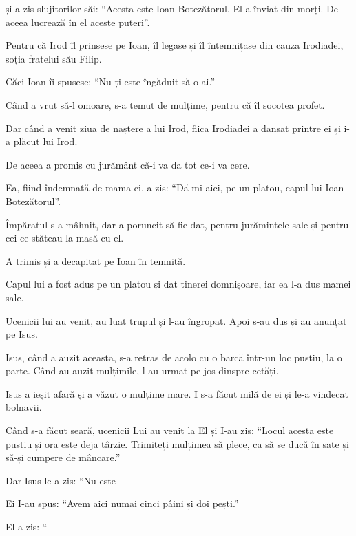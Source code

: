 {și a zis slujitorilor săi: “Acesta este Ioan Botezătorul. El a înviat din morți. De aceea lucrează în el aceste puteri”.

Pentru că Irod îl prinsese pe Ioan, îl legase și îl întemnițase din cauza Irodiadei, soția fratelui său Filip.

Căci Ioan îi spusese: “Nu-ți este îngăduit să o ai.”

Când a vrut să-l omoare, s-a temut de mulțime, pentru că îl socotea profet.

Dar când a venit ziua de naștere a lui Irod, fiica Irodiadei a dansat printre ei și i-a plăcut lui Irod.

De aceea a promis cu jurământ că-i va da tot ce-i va cere.

Ea, fiind îndemnată de mama ei, a zis: “Dă-mi aici, pe un platou, capul lui Ioan Botezătorul”.


\par }{\PP {}Împăratul s-a mâhnit, dar a poruncit să fie dat, pentru jurămintele sale și pentru cei ce stăteau la masă cu el.

A trimis și a decapitat pe Ioan în temniță.

Capul lui a fost adus pe un platou și dat tinerei domnișoare, iar ea l-a dus mamei sale.

Ucenicii lui au venit, au luat trupul și l-au îngropat. Apoi s-au dus și au anunțat pe Isus.

Isus, când a auzit aceasta, s-a retras de acolo cu o barcă într-un loc pustiu, la o parte. Când au auzit mulțimile, l-au urmat pe jos dinspre cetăți.


\par }{\PP {}Isus a ieșit afară și a văzut o mulțime mare. I s-a făcut milă de ei și le-a vindecat bolnavii.

Când s-a făcut seară, ucenicii Lui au venit la El și I-au zis: “Locul acesta este pustiu și ora este deja târzie. Trimiteți mulțimea să plece, ca să se ducă în sate și să-și cumpere de mâncare.”


\par }{\PP {}Dar Isus le-a zis: “Nu este
{}


\par }{\PP {}Ei I-au spus: “Avem aici numai cinci pâini și doi pești.”


\par }{\PP {}El a zis: “{}

}
